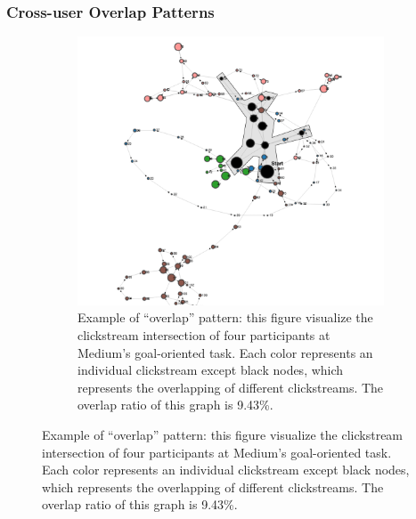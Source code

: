\subsubsection{Cross-user Overlap Patterns}

\begin{figure}[H]
    \centering

    \begin{subfigure}[b]{0.60\textwidth}
        \includegraphics[width=1\textwidth]{figures/overlap1}
        \caption{Example of ``overlap'' pattern: this figure visualize the clickstream intersection 
        of four participants at Medium's goal-oriented task. Each color represents an
        individual clickstream except black nodes, which represents the overlapping of different clickstreams.
        The overlap ratio of this graph is 9.43\%.}
        \label{fig:overlap-example-1}
    \end{subfigure}


\end{figure}
